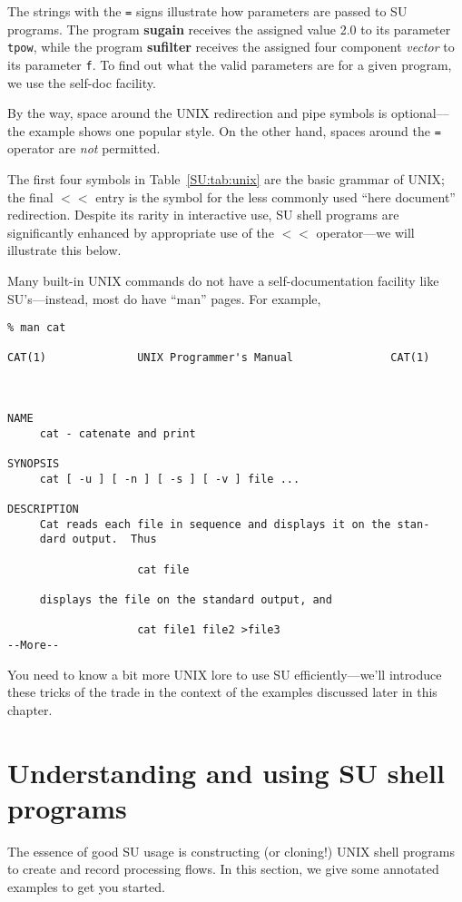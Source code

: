 {{{{{{{\label{SU:page:getpar}The strings with the \verb:=: signs illustrate
how parameters are passed to {\small\sf SU} programs.  The program {\bf sugain\/}
receives the assigned value 2.0 to its parameter \verb:tpow:, while
the program {\bf sufilter\/} receives the assigned four component {\em vector}
to its parameter \verb:f:.  To find out what the valid parameters are
for a given program, we use the self-doc facility.

By the way, space around the UNIX
redirection and pipe symbols is optional---the example shows
one popular style.  On the other hand, spaces around the \verb:=:
operator are {\em not} permitted.

The first four symbols in
Table~\ref{SU:tab:unix} are the basic grammar of UNIX;
the final $<<$ entry
is the symbol for the less commonly used ``here document'' redirection.
Despite its rarity in interactive use,
{\small\sf SU} shell programs are significantly enhanced by
appropriate use of the $<<$ operator---we will illustrate this below.

Many built-in UNIX commands do not have a self-documentation
facility like {\small\sf SU}'s---instead, most do have ``man'' pages.
For example,

{\small\begin{verbatim}
% man cat

CAT(1)              UNIX Programmer's Manual               CAT(1)



NAME
     cat - catenate and print

SYNOPSIS
     cat [ -u ] [ -n ] [ -s ] [ -v ] file ...

DESCRIPTION
     Cat reads each file in sequence and displays it on the stan-
     dard output.  Thus

                    cat file

     displays the file on the standard output, and

                    cat file1 file2 >file3
--More--
\end{verbatim}}\noindent
You need to know a bit more UNIX lore
to use {\small\sf SU} efficiently---we'll introduce these tricks of the trade in
the context of the examples discussed later in this chapter.



\section{Understanding and using SU shell programs}
The essence of good {\small\sf SU} usage is constructing (or cloning!)
UNIX shell programs to create and record processing flows.
In this section, we give some
annotated examples to get you started. 
}}}}}}}
